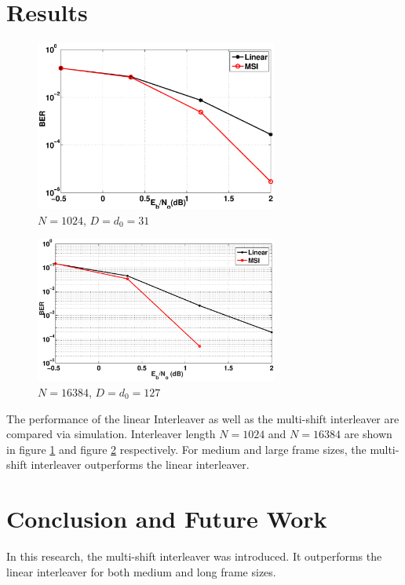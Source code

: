 \documentclass[twoside]{jarticle}
\begin{document}
  \section{Results}
    \begin{center}
\begin{figure}[h!]
\includegraphics[width=8cm]{msi_linear_256_1000Frames_2.eps}
\caption{$N=1024$, $D = d_0 = 31$ }
\label{x}
\end{figure}
\end{center}
\vspace{-8mm}
\begin{center}
\begin{figure}[h!]
\includegraphics[width=8cm]{msi_linear_16384.eps}
\caption{$N=16384$, $D = d_0 =127$}
\label{y}
\end{figure}
\end{center}
\vspace{-8mm}
  The performance of the linear Interleaver as well as the multi-shift interleaver are compared via simulation. Interleaver length $N=1024$ and $N=16384$ are shown in figure \ref{x} and figure \ref{y} respectively. For medium and large frame sizes, the multi-shift interleaver outperforms the linear interleaver.
  \vspace{-4mm}
\section{Conclusion and Future Work}
In this research, the multi-shift interleaver was introduced. It outperforms the linear interleaver for both medium and long frame sizes. 
\end{document}
